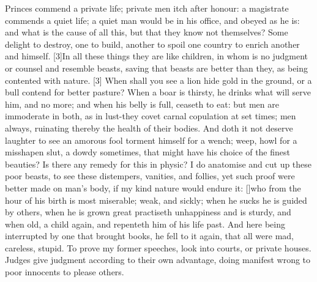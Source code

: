 { Princes commend a private life; private men itch after honour: a
magistrate commends a quiet life; a quiet man would be in his office,
and obeyed as he is: and what is the cause of all this, but that they
know not themselves? Some delight to destroy, one to build,
another to spoil one country to enrich another and himself. [3\baselineskip]In all
these things they are like children, in whom is no judgment or counsel
and resemble beasts, saving that beasts are better than they, as being
contented with nature. [3\baselineskip] When shall you see a lion hide gold in the
ground, or a bull contend for better pasture? When a boar is thirsty,
he drinks what will serve him, and no more; and when his belly is full,
ceaseth to eat: but men are immoderate in both, as in lust-they covet
carnal copulation at set times; men always, ruinating thereby the
health of their bodies. And doth it not deserve laughter to see an
amorous fool torment himself for a wench; weep, howl for a misshapen
slut, a dowdy sometimes, that might have his choice of the finest
beauties? Is there any remedy for this in physic? I do anatomise and
cut up these poor beasts, to see these distempers, vanities, and
follies, yet such proof were better made on man's body, if my kind
nature would endure it: [\baselineskip]who from the hour of his birth is most
miserable; weak, and sickly; when he sucks he is guided by others, when
he is grown great practiseth unhappiness and is sturdy, and when
old, a child again, and repenteth him of his life past. And here being
interrupted by one that brought books, he fell to it again, that all
were mad, careless, stupid. To prove my former speeches, look into
courts, or private houses. Judges give judgment according to their
own advantage, doing manifest wrong to poor innocents to please others.

}
